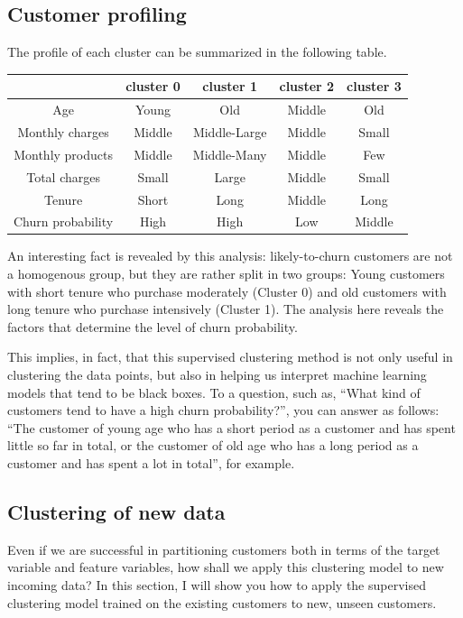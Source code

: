\documentclass{article}
\begin{document}
\subsection{Customer profiling}
The profile of each cluster can be summarized in the following table.

\begin{center}
\begin{tabular}{ |c||c c c c| } 
\hline
& cluster 0 & cluster 1 & cluster 2 & cluster 3 \\ 
\hline
Age & Young & Old & Middle & Old \\ 
Monthly charges & Middle & Middle-Large & Middle & Small\\ 
Monthly products & Middle & Middle-Many & Middle & Few\\ 
Total charges & Small & Large & Middle & Small\\ 
Tenure & Short & Long & Middle & Long \\ 
\hline \hline
Churn probability & High & High & Low & Middle\\ 
\hline
\end{tabular}
\end{center}

An interesting fact is revealed by this analysis: likely-to-churn customers are not a homogenous group, but they are rather split in two groups: Young customers with short tenure who purchase moderately (Cluster 0) and old customers with long tenure who purchase intensively (Cluster 1). The analysis here reveals the factors that determine the level of churn probability.

This implies, in fact, that this supervised clustering method is not only useful in clustering the data points, but also in helping us interpret machine learning models that tend to be black boxes. To a question, such as, ``What kind of customers tend to have a high churn probability?'', you can answer as follows: ``The customer of young age who has a short period as a customer and has spent little so far in total, or the customer of old age who has a long period as a customer and has spent a lot in total'', for example.

\subsection{Clustering of new data}
Even if we are successful in partitioning customers both in terms of the target variable and feature variables, how shall we apply this clustering model to new incoming data? In this section, I will show you how to apply the supervised clustering model trained on the existing customers to new, unseen customers.
\end{document}
